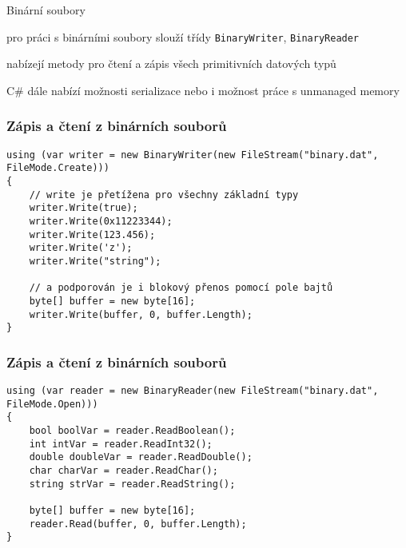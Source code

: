 


\begin{frame}[fragile]
\begin{bitemize}{Binární soubory}
\item pro práci s binárními soubory slouží třídy \lstinline|BinaryWriter|, \lstinline|BinaryReader|
\item nabízejí metody pro čtení a zápis všech primitivních datových typů
\item[]
\item C\# dále nabízí možnosti serializace nebo i možnost práce s unmanaged memory

\end{bitemize}
\end{frame}





\begin{frame}[fragile]
\frametitle{Zápis a čtení z binárních souborů}
\begin{yesblock}
\begin{lstlisting}
using (var writer = new BinaryWriter(new FileStream("binary.dat", FileMode.Create)))
{
    // write je přetížena pro všechny základní typy
    writer.Write(true);
    writer.Write(0x11223344);
    writer.Write(123.456);
    writer.Write('z');
    writer.Write("string");

    // a podporován je i blokový přenos pomocí pole bajtů
    byte[] buffer = new byte[16];
    writer.Write(buffer, 0, buffer.Length);
}
\end{lstlisting}
\end{yesblock}
\end{frame}


\begin{frame}[fragile]
\frametitle{Zápis a čtení z binárních souborů}
\begin{yesblock}
\begin{lstlisting}
using (var reader = new BinaryReader(new FileStream("binary.dat", FileMode.Open)))
{
    bool boolVar = reader.ReadBoolean();
    int intVar = reader.ReadInt32();
    double doubleVar = reader.ReadDouble();
    char charVar = reader.ReadChar();
    string strVar = reader.ReadString();

    byte[] buffer = new byte[16];
    reader.Read(buffer, 0, buffer.Length);
}
\end{lstlisting}
\end{yesblock}
\end{frame}




